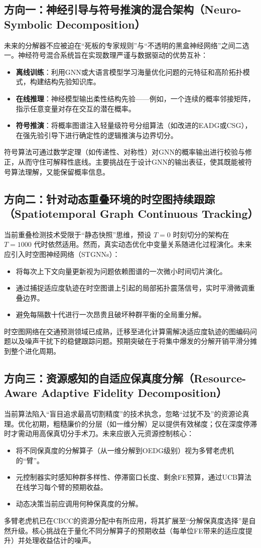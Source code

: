 \subsection{方向一：神经引导与符号推演的混合架构（Neuro-Symbolic Decomposition）}
未来的分解器不应被迫在“死板的专家规则”与“不透明的黑盒神经网络”之间二选一。神经符号混合系统旨在实现数理严谨与数据驱动的优势互补：
\begin{itemize}
    \item \textbf{离线训练}：利用GNN或大语言模型学习海量优化问题的元特征和高阶拓扑模式，构建结构先验知识库。
    \item \textbf{在线推理}：神经模型输出柔性结构先验——例如，一个连续的概率邻接矩阵，指示任意变量对存在交互的潜在概率。
    \item \textbf{符号推演}：将概率图谱注入轻量级符号分组算法（如改进的EADG或CSG），在强先验引导下进行确定性的逻辑推演与边界切分。
\end{itemize}
符号算法可通过数学定理（如传递性、对称性）对GNN的概率输出进行校验与修正，从而守住可解释性底线。主要挑战在于设计GNN的输出表征，使其既能被符号算法理解，又能保留概率信息。

\subsection{方向二：针对动态重叠环境的时空图持续跟踪（Spatiotemporal Graph Continuous Tracking）}
当前重叠检测技术受限于“静态快照”思维，预设 $T=0$ 时刻切分的架构在 $T=1000$ 代时依然适用。然而，真实动态优化中变量关系随进化过程演化。未来应引入时空图神经网络（STGNNs）：
\begin{itemize}
    \item 将每次上下文向量更新视为问题依赖图谱的一次微小时间切片演化。
    \item 通过捕捉适应度轨迹在时空图谱上引起的局部拓扑震荡信号，实时平滑微调重叠边界。
    \item 避免每隔数十代进行一次昂贵且破坏种群平衡的全局重分解。
\end{itemize}
时空图网络在交通预测领域已成熟，迁移至进化计算需解决适应度轨迹的图编码问题以及噪声干扰下的稳健跟踪问题。预期突破在于将集中爆发的分解开销平滑分摊到整个进化周期。

\subsection{方向三：资源感知的自适应保真度分解（Resource-Aware Adaptive Fidelity Decomposition）}
当前算法陷入“盲目追求最高切割精度”的技术执念，忽略“过犹不及”的资源论真理。优化初期，粗糙廉价的分层（如一维分解）足以提供有效梯度；仅在深度停滞时才需动用高保真切分手术刀。未来应嵌入元资源控制核心：
\begin{itemize}
    \item 将不同保真度的分解算子（从一维分解到OEDG级别）视为多臂老虎机的“臂”。
    \item 元控制器实时感知种群多样性、停滞窗口长度、剩余FE预算，通过UCB算法在线学习每个臂的预期收益。
    \item 动态决策当前应调用何种保真度的分解。
\end{itemize}
多臂老虎机已在CBCC的资源分配中有所应用，将其扩展至“分解保真度选择”是自然升级。核心挑战在于量化不同分解算子的预期收益（每单位FE带来的适应度提升）并处理收益估计的噪声。

